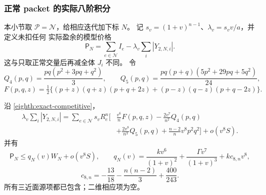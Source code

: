 \subsubsection{正常 packet 的实际八阶积分}

本小节取 \(\mathscr P=\mathcal N\)，给相应迭代加下标 \(N\)。
记 \(s_v=(1+v)^{n-1}\)、\(\lambda_v=s_vv/a\)，并定义未扣任何
实际盈余的模型价格
\[
 \mathsf P_N=\sum_{e\in\mathcal N}I_e-\lambda_v\sum_i|Y_{2,N,i}|.
\]
这与只取正常交量后再减全体 \(J_i\) 不同。
令
\[
 Q_4(p,q)=\frac{pq(p^2+3pq+q^2)}3,\qquad
 Q_5(p,q)=\frac{pq(p+q)(5p^2+29pq+5q^2)}{24},
\]
\[
 F(p,q,z)=\tfrac12\{(p+z)(q+z)(p+q+2z)
                         +(p-z)(q-z)(p+q-2z)\}.
\]

\begin{lemma}[实际源成本及正常模型价]\label{eighth:exact-normal-price}
沿 \eqref{eighth:exact-competitive}，
\begin{equation}\label{eighth:exact-normal-integral}
 \begin{aligned}
 \lambda_v\sum_i|Y_{2,N,i}|
 =\sum_{e\in\mathcal N}s_vR_e^n\biggl[
 &\frac{v^6}{n}F(p,q,z)-\frac{2v^7}{n^2}Q_4(p,q)\\
 &+\frac{2v^8}{n^3}Q_5(p,q)
       +\frac{n-2}{n}v^8p^2q^2\biggr]+o(v^8S).
 \end{aligned}
\end{equation}
并有
\begin{equation}\label{eighth:exact-model-price}
 \mathsf P_N\le q_N(v)W_N+o(v^8S),\qquad
 q_N(v)=\frac{k v^6}{(1+v)^2}
       +\frac{\Gamma v^7}{(1+v)^3}+k c_{8,n}v^8,
\end{equation}
\[
 c_{8,n}=-\frac{13}{18}-\frac{n(n-2)}3+\frac{400}{243}.
\]
所有三近面源项都已包含；二维相应项为空。
\end{lemma}
